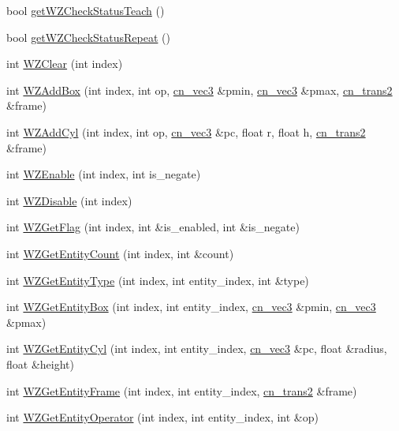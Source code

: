 \begin{DoxyCompactItemize}
bool \hyperlink{classCNRobo_af14e9ea64a1f88009d1d452a3c89e99d}{get\-W\-Z\-Check\-Status\-Teach} ()
\item 
bool \hyperlink{classCNRobo_a772d73f8b057c060cbf96328451ba818}{get\-W\-Z\-Check\-Status\-Repeat} ()
\item 
int \hyperlink{classCNRobo_a239466cbc0a80ac3074a9684d63fb326}{W\-Z\-Clear} (int index)
\item 
int \hyperlink{classCNRobo_af8822719c79d61aab00151872db749b1}{W\-Z\-Add\-Box} (int index, int op, \hyperlink{structcn__vec3}{cn\-\_\-vec3} \&pmin, \hyperlink{structcn__vec3}{cn\-\_\-vec3} \&pmax, \hyperlink{structcn__trans2}{cn\-\_\-trans2} \&frame)
\item 
int \hyperlink{classCNRobo_a652a283db5c8d44714437911ffa4ad8f}{W\-Z\-Add\-Cyl} (int index, int op, \hyperlink{structcn__vec3}{cn\-\_\-vec3} \&pc, float r, float h, \hyperlink{structcn__trans2}{cn\-\_\-trans2} \&frame)
\item 
int \hyperlink{classCNRobo_a78c263b9de4216bcf46cd9c6715b92e9}{W\-Z\-Enable} (int index, int is\-\_\-negate)
\item 
int \hyperlink{classCNRobo_a778a2aaf2da01ae4d06568c08810f78a}{W\-Z\-Disable} (int index)
\item 
int \hyperlink{classCNRobo_a3920c0758e9d0929ff5da3a69c675ffd}{W\-Z\-Get\-Flag} (int index, int \&is\-\_\-enabled, int \&is\-\_\-negate)
\item 
int \hyperlink{classCNRobo_afb5dc8f45756a74f6fcf2525d1288ed5}{W\-Z\-Get\-Entity\-Count} (int index, int \&count)
\item 
int \hyperlink{classCNRobo_a129dc251de0a8b8d799510aa51fa83cd}{W\-Z\-Get\-Entity\-Type} (int index, int entity\-\_\-index, int \&type)
\item 
int \hyperlink{classCNRobo_a5dad5e97355608bea2fca066c8f647c8}{W\-Z\-Get\-Entity\-Box} (int index, int entity\-\_\-index, \hyperlink{structcn__vec3}{cn\-\_\-vec3} \&pmin, \hyperlink{structcn__vec3}{cn\-\_\-vec3} \&pmax)
\item 
int \hyperlink{classCNRobo_ae340640ec23d10b48b3913ecbad9c823}{W\-Z\-Get\-Entity\-Cyl} (int index, int entity\-\_\-index, \hyperlink{structcn__vec3}{cn\-\_\-vec3} \&pc, float \&radius, float \&height)
\item 
int \hyperlink{classCNRobo_a6b316049213695df1319f32ccef83b6d}{W\-Z\-Get\-Entity\-Frame} (int index, int entity\-\_\-index, \hyperlink{structcn__trans2}{cn\-\_\-trans2} \&frame)
\item 
int \hyperlink{classCNRobo_a3fc694ecd3647f07d2b5504f0c9af00f}{W\-Z\-Get\-Entity\-Operator} (int index, int entity\-\_\-index, int \&op)

\end{DoxyCompactItemize}

